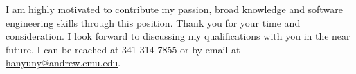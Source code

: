 \documentclass[11pt,a4paper,roman]{moderncv}        %
\begin{document}
I am highly motivated to contribute my passion, broad knowledge and software engineering skills through this position.
Thank you for your time and consideration. 
I look forward to discussing my qualifications with you in the near future.
I can be reached at 341-314-7855 or by email at \href{mailto:hanyuny@andrerw.cmu.edu}{hanyuny@andrew.cmu.edu}.

\vspace{0.5cm}


\makeletterclosing
\end{document}
